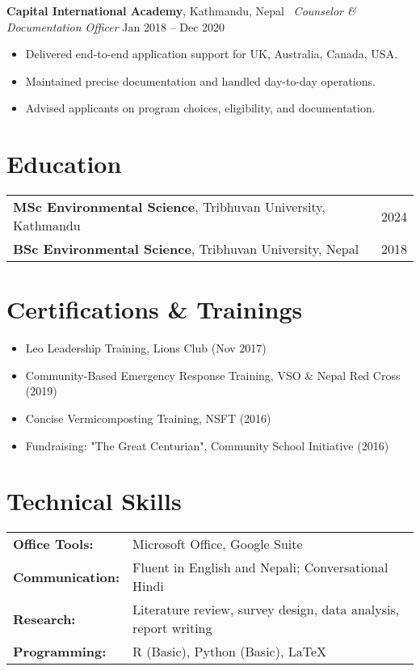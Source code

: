\documentclass[11pt,a4paper]{article}
\begin{document}
\textbf{Capital International Academy}, Kathmandu, Nepal \
\textit{Counselor \& Documentation Officer} \hfill Jan 2018 -- Dec 2020
\begin{itemize}[leftmargin=*]
    \item Delivered end-to-end application support for UK, Australia, Canada, USA.
    \item Maintained precise documentation and handled day-to-day operations.
    \item Advised applicants on program choices, eligibility, and documentation.
\end{itemize}

\section*{Education}
\begin{tabular}{@{}p{}r@{}}
\textbf{MSc Environmental Science}, Tribhuvan University, Kathmandu & 2024 \\
\textbf{BSc Environmental Science}, Tribhuvan University, Nepal & 2018 \\
\end{tabular}

\section*{Certifications \& Trainings}
\begin{itemize}[leftmargin=*]
    \item Leo Leadership Training, Lions Club (Nov 2017)
    \item Community-Based Emergency Response Training, VSO \& Nepal Red Cross (2019)
    \item Concise Vermicomposting Training, NSFT (2016)
    \item Fundraising: "The Great Centurian", Community School Initiative (2016)
\end{itemize}

\section*{Technical Skills}
\begin{tabular}{@{}ll@{}}
\textbf{Office Tools:} & Microsoft Office, Google Suite \\
\textbf{Communication:} & Fluent in English and Nepali; Conversational Hindi \\
\textbf{Research:} & Literature review, survey design, data analysis, report writing \\
\textbf{Programming:} & R (Basic), Python (Basic), LaTeX \\
\end{tabular}
\end{document}
